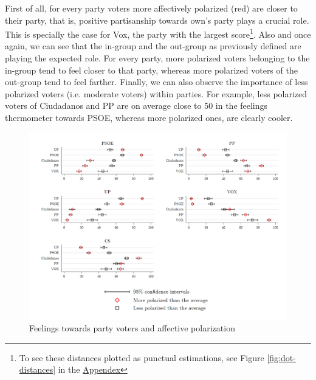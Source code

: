 \documentclass[a4paper, svgnames]{article}
\begin{document}
First of all, for every party voters more affectively polarized (red) are closer to their party, that is, positive partisanship towards own's party plays a crucial role. This is specially the case for Vox, the party with the largest score\footnote{To see these distances plotted as punctual estimations, see Figure \ref{fig:dot-distances} in the \hyperref[appendix]{Appendex}}. Also and once again, we can see that the in-group and the out-group as previously defined are playing the expected role. For every party, more polarized voters belonging to the in-group tend to feel closer to that party, whereas more polarized voters of the out-group tend to feel farther. Finally, we can also observe the importance of less polarized voters (i.e. moderate voters) within parties. For example, less polarized voters of Ciudadanos and PP are on average close to 50 in the feelings thermometer towards PSOE, whereas more polarized ones, are clearly cooler.

\begin{figure}[H]
	\centering
	\includegraphics[width=\textwidth]{Figures/combinedfeelingsAP.png}
	\caption{\label{fig:feelings} Feelings towards party voters and affective polarization}
\end{figure}
\end{document}
